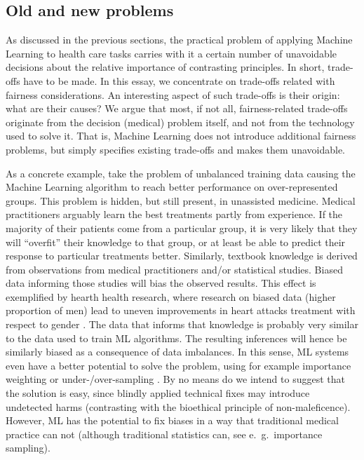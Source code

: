 \subsection{Old and new problems}
As discussed in the previous sections, the practical problem of applying Machine Learning to health care tasks carries with it a certain number of unavoidable decisions about the relative importance of contrasting principles.
In short, trade-offs have to be made.
In this essay, we concentrate on trade-offs related with fairness considerations.
An interesting aspect of such trade-offs is their origin: what are their causes?
We argue that most, if not all, fairness-related trade-offs originate from the decision (medical) problem itself, and not from the technology used to solve it.
That is, Machine Learning does not introduce additional fairness problems, but simply specifies existing trade-offs and makes them unavoidable.

As a concrete example, take the problem of unbalanced training data causing the Machine Learning algorithm to reach better performance on over-represented groups.
This problem is hidden, but still present, in unassisted medicine.
Medical practitioners arguably learn the best treatments partly from experience.
If the majority of their patients come from a particular group, it is very likely that they will ``overfit'' their knowledge to that group, or at least be able to predict their response to particular treatments better.
Similarly, textbook knowledge is derived from observations from medical practitioners and/or statistical studies.
Biased data informing those studies will bias the observed results.
This effect is exemplified by hearth health research, where research on biased data (higher proportion of men) lead to uneven improvements in heart attacks treatment with respect to gender \cite[e221]{Mccradden2020}.
The data that informs that knowledge is probably very similar to the data used to train ML algorithms.
The resulting inferences will hence be similarly biased as a consequence of data imbalances.
In this sense, ML systems even have a better potential to solve the problem, using for example importance weighting or under-/over-sampling \cite[pp.~6-8]{Chen2021}.
By no means do we intend to suggest that the solution is easy, since blindly applied technical fixes may introduce undetected harms (contrasting with the bioethical principle of non-maleficence).
However, ML has the potential to fix biases in a way that traditional medical practice can not \cite[p.~e222]{Mccradden2020} (although traditional statistics can, see e.~g.~importance sampling).

